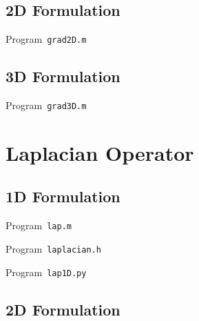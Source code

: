 \subsection{2D Formulation}

\begin{listing}[ht!]
	\tiny
	\centering
	\caption{Program~\texttt{grad2D.m}}
	\label{code:grad2D.m}
\end{listing}

\subsection{3D Formulation}

\begin{listing}[ht!]
	\tiny
	\centering
	\caption{Program~\texttt{grad3D.m}}
	\label{code:grad3D.m}
\end{listing}

\section{Laplacian Operator}

\subsection{1D Formulation}

\begin{listing}[ht!]
	\tiny
	\centering
	\caption{Program~\texttt{lap.m}}
	\label{code:lap.m}
\end{listing}

\begin{listing}[ht!]
	\tiny
	\centering
	\caption{Program~\texttt{laplacian.h}}
	\label{code:laplacian.h}
\end{listing}

\begin{listing}[ht!]
	\tiny
	\centering
	\caption{Program~\texttt{lap1D.py}}
	\label{code:lap1D.py}
\end{listing}

\subsection{2D Formulation}

